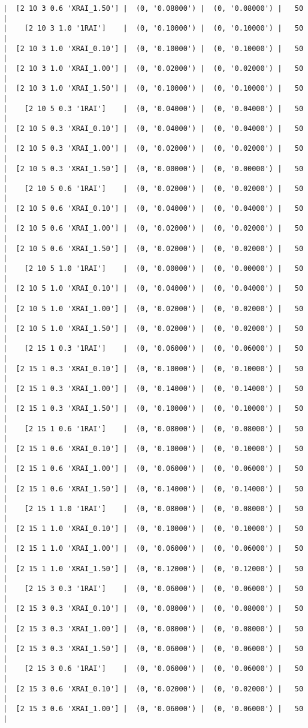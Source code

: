 \documentclass{article}
\begin{document}
\begin{verbatim}
|  [2 10 3 0.6 'XRAI_1.50'] |  (0, '0.08000') |  (0, '0.08000') |   50  |
|    [2 10 3 1.0 '1RAI']    |  (0, '0.10000') |  (0, '0.10000') |   50  |
|  [2 10 3 1.0 'XRAI_0.10'] |  (0, '0.10000') |  (0, '0.10000') |   50  |
|  [2 10 3 1.0 'XRAI_1.00'] |  (0, '0.02000') |  (0, '0.02000') |   50  |
|  [2 10 3 1.0 'XRAI_1.50'] |  (0, '0.10000') |  (0, '0.10000') |   50  |
|    [2 10 5 0.3 '1RAI']    |  (0, '0.04000') |  (0, '0.04000') |   50  |
|  [2 10 5 0.3 'XRAI_0.10'] |  (0, '0.04000') |  (0, '0.04000') |   50  |
|  [2 10 5 0.3 'XRAI_1.00'] |  (0, '0.02000') |  (0, '0.02000') |   50  |
|  [2 10 5 0.3 'XRAI_1.50'] |  (0, '0.00000') |  (0, '0.00000') |   50  |
|    [2 10 5 0.6 '1RAI']    |  (0, '0.02000') |  (0, '0.02000') |   50  |
|  [2 10 5 0.6 'XRAI_0.10'] |  (0, '0.04000') |  (0, '0.04000') |   50  |
|  [2 10 5 0.6 'XRAI_1.00'] |  (0, '0.02000') |  (0, '0.02000') |   50  |
|  [2 10 5 0.6 'XRAI_1.50'] |  (0, '0.02000') |  (0, '0.02000') |   50  |
|    [2 10 5 1.0 '1RAI']    |  (0, '0.00000') |  (0, '0.00000') |   50  |
|  [2 10 5 1.0 'XRAI_0.10'] |  (0, '0.04000') |  (0, '0.04000') |   50  |
|  [2 10 5 1.0 'XRAI_1.00'] |  (0, '0.02000') |  (0, '0.02000') |   50  |
|  [2 10 5 1.0 'XRAI_1.50'] |  (0, '0.02000') |  (0, '0.02000') |   50  |
|    [2 15 1 0.3 '1RAI']    |  (0, '0.06000') |  (0, '0.06000') |   50  |
|  [2 15 1 0.3 'XRAI_0.10'] |  (0, '0.10000') |  (0, '0.10000') |   50  |
|  [2 15 1 0.3 'XRAI_1.00'] |  (0, '0.14000') |  (0, '0.14000') |   50  |
|  [2 15 1 0.3 'XRAI_1.50'] |  (0, '0.10000') |  (0, '0.10000') |   50  |
|    [2 15 1 0.6 '1RAI']    |  (0, '0.08000') |  (0, '0.08000') |   50  |
|  [2 15 1 0.6 'XRAI_0.10'] |  (0, '0.10000') |  (0, '0.10000') |   50  |
|  [2 15 1 0.6 'XRAI_1.00'] |  (0, '0.06000') |  (0, '0.06000') |   50  |
|  [2 15 1 0.6 'XRAI_1.50'] |  (0, '0.14000') |  (0, '0.14000') |   50  |
|    [2 15 1 1.0 '1RAI']    |  (0, '0.08000') |  (0, '0.08000') |   50  |
|  [2 15 1 1.0 'XRAI_0.10'] |  (0, '0.10000') |  (0, '0.10000') |   50  |
|  [2 15 1 1.0 'XRAI_1.00'] |  (0, '0.06000') |  (0, '0.06000') |   50  |
|  [2 15 1 1.0 'XRAI_1.50'] |  (0, '0.12000') |  (0, '0.12000') |   50  |
|    [2 15 3 0.3 '1RAI']    |  (0, '0.06000') |  (0, '0.06000') |   50  |
|  [2 15 3 0.3 'XRAI_0.10'] |  (0, '0.08000') |  (0, '0.08000') |   50  |
|  [2 15 3 0.3 'XRAI_1.00'] |  (0, '0.08000') |  (0, '0.08000') |   50  |
|  [2 15 3 0.3 'XRAI_1.50'] |  (0, '0.06000') |  (0, '0.06000') |   50  |
|    [2 15 3 0.6 '1RAI']    |  (0, '0.06000') |  (0, '0.06000') |   50  |
|  [2 15 3 0.6 'XRAI_0.10'] |  (0, '0.02000') |  (0, '0.02000') |   50  |
|  [2 15 3 0.6 'XRAI_1.00'] |  (0, '0.06000') |  (0, '0.06000') |   50  |

\end{verbatim}
\end{document}
